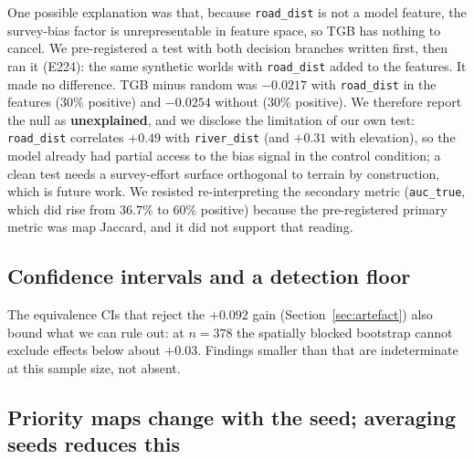 \documentclass[12pt]{article}
\begin{document}
One possible explanation was that, because \texttt{road\_dist} is not a model feature, the survey-bias factor is unrepresentable in feature space, so TGB has nothing to cancel.
We pre-registered a test with both decision branches written first, then ran it (E224): the same synthetic worlds with \texttt{road\_dist} added to the features.
It made no difference.
TGB minus random was $-0.0217$ with \texttt{road\_dist} in the features (30\% positive) and $-0.0254$ without (30\% positive).
We therefore report the null as \textbf{unexplained}, and we disclose the limitation of our own test: \texttt{road\_dist} correlates $+0.49$ with \texttt{river\_dist} (and $+0.31$ with elevation), so the model already had partial access to the bias signal in the control condition; a clean test needs a survey-effort surface orthogonal to terrain by construction, which is future work.
We resisted re-interpreting the secondary metric (\texttt{auc\_true}, which did rise from $36.7\%$ to $60\%$ positive) because the pre-registered primary metric was map Jaccard, and it did not support that reading.

\subsection{Confidence intervals and a detection floor}
\label{sec:ci}

The equivalence CIs that reject the $+0.092$ gain (Section~\ref{sec:artefact}) also bound what we can rule out: at $n=378$ the spatially blocked bootstrap cannot exclude effects below about $+0.03$.
Findings smaller than that are indeterminate at this sample size, not absent.

\subsection{Priority maps change with the seed; averaging seeds reduces this}
\label{sec:prioritymaps}
\end{document}
